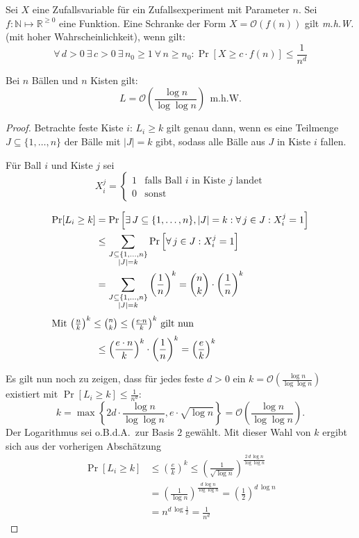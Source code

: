 \begin{defn}
	Sei $X$ eine Zufallsvariable für ein Zufallsexperiment mit Parameter
	$n$. Sei $f : \mathbb{N} \mapsto \mathbb{R}^{\geq 0}$ eine Funktion.
	Eine Schranke der Form $X = \mathcal{O}\left(f(n)\right)$ gilt
	\emph{m.h.W.} (mit hoher Wahrscheinlichkeit), wenn gilt:
	\[ \forall\,d > 0 \ \exists\,c > 0 \ \exists\,n_0 \geq 1 \ \forall\,n
	\geq n_0 : \Pr\left[ X \geq c \cdot f(n)\right] \leq \frac{1}{n^d} \]
\end{defn}
\begin{satz}
	Bei $n$ Bällen und $n$ Kisten gilt:
	\[ L = \mathcal{O}\left(\frac{\log n}{\log \log n}\right) \ \
	\text{m.h.W.} \]
\end{satz}
\begin{proof}
	Betrachte feste Kiste $i$: $L_i \geq k$ gilt genau dann, wenn es eine
	Teilmenge $J \subseteq \{1, \dots, n \}$ der Bälle mit $|J| = k$ gibt,
	sodass alle Bälle aus $J$ in Kiste $i$ fallen.

	Für Ball $i$ und Kiste $j$ sei
	\[
	  X_i^j = \begin{cases} 1 & \text{falls Ball $i$ in Kiste $j$ landet}\\
		  0 & \text{sonst} \end{cases}
	\]

	\begin{align*}
	  \Pr[L_i \geq k] &= \Pr\left[ \exists\,J \subseteq \{1, \dots, n\}, |J| =
	  k : \forall\,j \in J : X_i^j = 1 \right] \\
	  &\leq \sum_{\substack{J\subseteq\{1,\dots,n\}\\|J|=k}}
	  \Pr\left[\forall\,j \in J : X_i^j = 1\right] \\
	  &= \sum_{\substack{J\subseteq\{1,\dots,n\}\\|J|=k}}
	  \left(\frac{1}{n}\right)^k = \binom{n}{k} \cdot \left(\frac{1}{n}\right)^k \\
	  \intertext{Mit $\left(\frac{n}{k}\right)^k \leq \binom{n}{k} \leq
	  \left(\frac{e\cdot n}{k}\right)^k$ gilt nun}
	  &\leq \left( \frac{e\cdot n}{k} \right)^k \cdot \left( \frac{1}{n}
	  \right)^k = \left( \frac{e}{k} \right)^k
	\end{align*}

	Es gilt nun noch zu zeigen, dass für jedes feste $d > 0$ ein $k =
	\mathcal{O}\left(\frac{\log n}{\log \log n}\right)$ existiert mit
	$\Pr[L_i \geq k] \leq \frac{1}{n^d}$:
	\[
	  k = \max \left\{ 2 d \cdot \frac{\log n}{\log \log n}, e \cdot
	  \sqrt{\log n} \right\} = \mathcal{O}\left(\frac{\log n}{\log \log
	  n}\right).
	\]
	Der Logarithmus sei o.B.d.A.\ zur Basis $2$ gewählt. Mit dieser Wahl
	von $k$ ergibt sich aus der vorherigen Abschätzung
	\begin{align*}
		\Pr[L_i \geq k] &\leq \left(\frac{e}{k}\right)^k \leq \left(
		\frac{1}{\sqrt{\log n}} \right)^{\frac{2\,d\,\log n}{\log \log
		n}} \\
		&= \left( \frac{1}{\log n} \right)^{\frac{d\,\log
		n}{\log \log n}} = \left(\frac{1}{2}\right)^{d\,\log n} \\
		&= n^{d\,\log \frac{1}{2}} = \frac{1}{n^d}
	\end{align*}
	

\end{proof}
